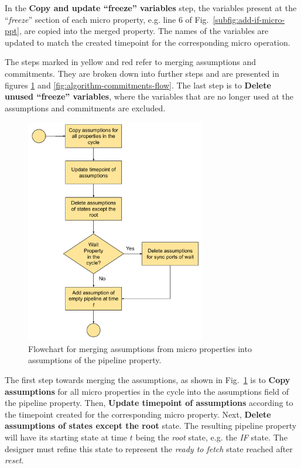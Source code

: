 In the \textbf{Copy and update “freeze” variables} step, the variables present at the “\textit{freeze}” section of each micro property, e.g. line 6 of Fig.~\ref{subfig:add-if-micro-ppt}, are copied into the merged property. The names of the variables are updated to match the created timepoint for the corresponding micro operation.

The steps marked in yellow and red refer to merging assumptions and commitments. They are broken down into further steps and are presented in figures \ref{fig:algorithm-assumptions-flow} and \ref{fig:algorithm-commitments-flow}. The last step is to \textbf{Delete unused “freeze” variables}, where the variables that are no longer used at the assumptions and commitments are excluded. 

\begin{figure}[htb!]
	\centering
	\includegraphics[width=0.7\textwidth]{images/algorithm_assumptions.pdf}
	\caption{Flowchart for merging assumptions from micro properties into assumptions of the pipeline property.}
	\label{fig:algorithm-assumptions-flow}
\end{figure}

The first step towards merging the assumptions, as shown in Fig.~\ref{fig:algorithm-assumptions-flow} is to \textbf{Copy assumptions} for all micro properties in the cycle into the assumptions field of the pipeline property. Then, \textbf{Update timepoint of assumptions} according to the timepoint created for the corresponding micro property. Next,\textbf{ Delete assumptions of states except the root} state. The resulting pipeline property will have its starting state at time $t$ being the \textit{root} state, e.g. the \textit{IF} state. The designer must refine this state to represent the \textit{ready to fetch} state reached after \textit{reset}.

